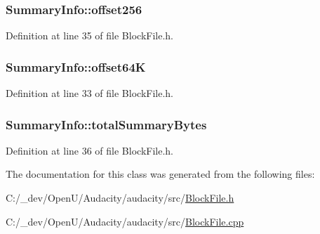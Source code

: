 \subsubsection[{\texorpdfstring{offset256}{offset256}}]{ Summary\+Info\+::offset256}\hypertarget{class_summary_info_ab41427f2e0bf3978ffec891676cdd794}{}\label{class_summary_info_ab41427f2e0bf3978ffec891676cdd794}


Definition at line 35 of file Block\+File.\+h.

\subsubsection[{\texorpdfstring{offset64K}{offset64K}}]{ Summary\+Info\+::offset64K}\hypertarget{class_summary_info_aca2983511bb953ffa03d1d007fac7ab7}{}\label{class_summary_info_aca2983511bb953ffa03d1d007fac7ab7}


Definition at line 33 of file Block\+File.\+h.

\subsubsection[{\texorpdfstring{total\+Summary\+Bytes}{totalSummaryBytes}}]{ Summary\+Info\+::total\+Summary\+Bytes}\hypertarget{class_summary_info_a4d7f7e6b04369c78c001cb46390a9d96}{}\label{class_summary_info_a4d7f7e6b04369c78c001cb46390a9d96}


Definition at line 36 of file Block\+File.\+h.



The documentation for this class was generated from the following files\+:\begin{DoxyCompactItemize}
\item 
C\+:/\+\_\+dev/\+Open\+U/\+Audacity/audacity/src/\hyperlink{_block_file_8h}{Block\+File.\+h}\item 
C\+:/\+\_\+dev/\+Open\+U/\+Audacity/audacity/src/\hyperlink{_block_file_8cpp}{Block\+File.\+cpp}\end{DoxyCompactItemize}

